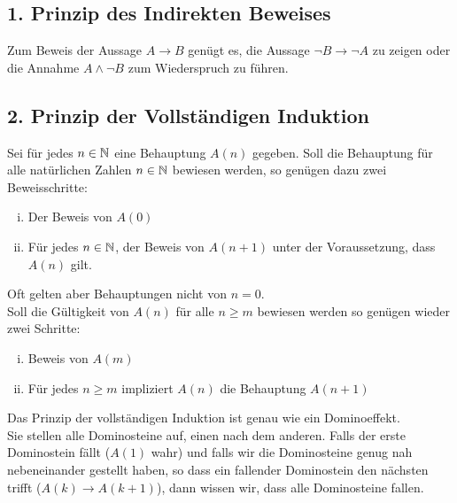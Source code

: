  \subsection*{1. Prinzip des Indirekten Beweises}
Zum Beweis der Aussage $A\to B$ genügt es, die Aussage $\lnot B\to\lnot A$ zu zeigen oder die Annahme $A\land\lnot B$ zum Wiederspruch zu führen.
\subsection*{2. Prinzip der Vollständigen Induktion}
Sei für jedes $n\in\mathbb{N}$ eine Behauptung $A(n)$ gegeben. Soll die Behauptung für alle natürlichen Zahlen $n\in\mathbb{N}$ bewiesen werden, so genügen dazu zwei Beweisschritte:
\begin{enumerate}[i)]
\item Der Beweis von $A(0)$
\item Für jedes $n\in\mathbb{N}$, der Beweis von $A(n+1)$ unter der Voraussetzung, dass $A(n)$ gilt. 
\end{enumerate}
Oft gelten aber Behauptungen nicht von $n=0$. \\
Soll die Gültigkeit von $A(n)$ für alle $n\geq m$ bewiesen werden so genügen wieder zwei Schritte:
\begin{enumerate}[i)]
	\item Beweis von $A(m)$
	\item Für jedes $n\geq m$ impliziert $A(n)$ die Behauptung $A(n+1)$
\end{enumerate}
Das Prinzip der vollständigen Induktion ist genau wie ein Dominoeffekt.\\

Sie stellen alle Dominosteine  auf, einen nach dem anderen. Falls der erste Dominostein fällt ($A(1)$ wahr) und falls wir die Dominosteine genug nah nebeneinander gestellt haben, so dass ein fallender Dominostein den nächsten trifft ($A(k)\to A(k+1)$), dann wissen wir, dass alle Dominosteine fallen. 

